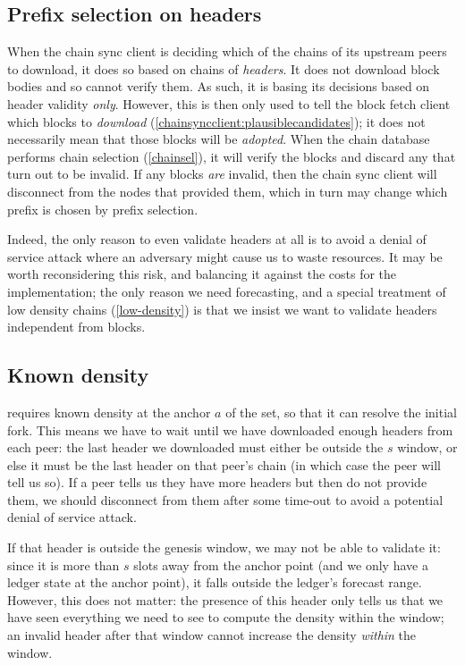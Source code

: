 \subsection{Prefix selection on headers}

When the chain sync client is deciding which of the chains of its upstream peers
to download, it does so based on chains of \emph{headers}. It does not download
block bodies and so cannot verify them. As such, it is basing its decisions
based on header validity \emph{only}.  However, this is then only used to tell
the block fetch client which blocks to \emph{download}
(\cref{chainsyncclient:plausiblecandidates}); it does not necessarily mean that
those blocks will be \emph{adopted}. When the chain database performs chain
selection (\cref{chainsel}), it will verify the blocks and discard any that turn
out to be invalid. If any blocks \emph{are} invalid, then the chain sync client
will disconnect from the nodes that provided them, which in turn may change
which prefix is chosen by prefix selection.

Indeed, the only reason to even validate headers at all is to avoid a denial
of service attack where an adversary might cause us to waste resources.
It may be worth reconsidering this risk, and balancing it against the costs
for the implementation; the only reason we need forecasting, and a special
treatment of low density chains (\cref{low-density}) is that we insist we want
to validate headers independent from blocks.

\pagebreak
\subsection{Known density}

 requires known density at the anchor $a$ of the set, so
that it can resolve the initial fork. This means we have to wait until
we have downloaded enough headers from each peer: the last header we downloaded
must either be outside the $s$ window, or else it must be the last header on that
peer's chain (in which case the peer will tell us so). If a peer tells us they have
more headers but then do not provide them, we should disconnect from them
after some time-out to avoid a potential denial of service attack.

If that header is outside the genesis window, we may not be able to validate it:
since it is more than $s$ slots away from the anchor point (and we only have a
ledger state at the anchor point), it falls outside the ledger's forecast range.
However, this does not matter: the presence of this header only tells us that we
have seen everything we need to see to compute the density within the window; an
invalid header after that window cannot increase the density \emph{within} the
window.

